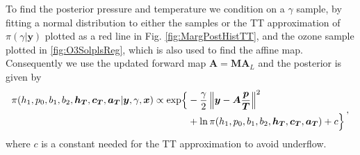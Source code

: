 To find the posterior pressure and temperature we condition on a $\gamma$ sample, by fitting a normal distribution to either the samples or the TT approximation of $\pi(\gamma|\bm{y})$ plotted as a red line in Fig. \ref{fig:MargPostHistTT}, and the ozone sample plotted in \ref{fig:O3SolplsReg}, which is also used to find the affine map.
Consequently we use the updated forward map $\bm{A}= \bm{M}\bm{A}_L$ and the posterior is given by 
\begin{align}
	\begin{split}
	\pi(h_1,p_0,b_1,b_2,\bm{h_T},\bm{c_T},\bm{a_T} | \bm{y}, \gamma, \bm{x}) \propto  \exp\Bigl\{ & -\frac{\gamma}{2} \left\Vert \bm{y}- \bm{A} \frac{\bm{p}}{\bm{T}}  \right\Vert^2 \\ &+ \ln{\pi(h_1,p_0,b_1,b_2,\bm{h_T},\bm{c_T},\bm{a_T}) + c \Bigr\}  }
	\end{split} \, ,
\end{align}
where $c$ is a constant needed for the TT approximation to avoid underflow.

